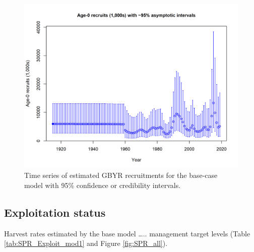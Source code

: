 \documentclass[12pt,]{article}
\begin{document}
\FloatBarrier

\begin{figure}
\centering
\includegraphics{r4ss/plots_mod1/ts11_Age-0_recruits_(1000s)_with_95_asymptotic_intervals.png}
\caption{Time series of estimated GBYR recruitments for the base-case
model with 95\% confidence or credibility intervals.
\label{fig:Recruits_all}}
\end{figure}

\FloatBarrier

\subsection*{Exploitation status}\label{exploitation-status}

Harvest rates estimated by the base model \ldots{}.. management target
levels (Table \ref{tab:SPR_Exploit_mod1} and Figure \ref{fig:SPR_all}).

\FloatBarrier
\end{document}
